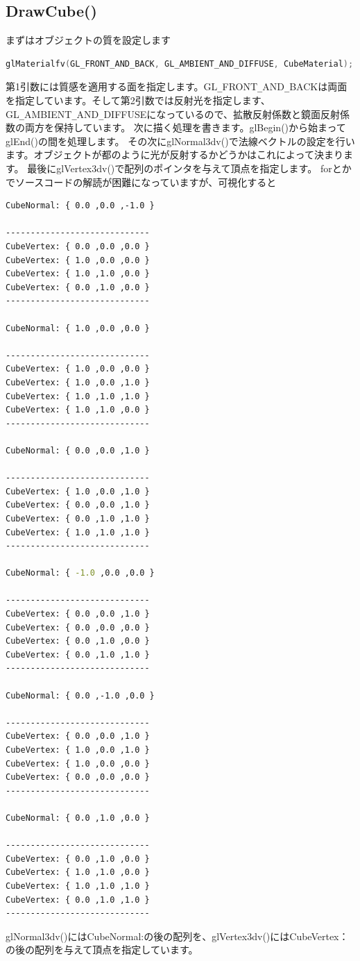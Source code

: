 \documentclass[a4paper,titlepage,dvipdfmx]{jsarticle}
\begin{document}
\subsection{DrawCube()}
まずはオブジェクトの質を設定します
\begin{lstlisting}[language=C++]
glMaterialfv(GL_FRONT_AND_BACK, GL_AMBIENT_AND_DIFFUSE, CubeMaterial);
\end{lstlisting}
第1引数には質感を適用する面を指定します。GL\verb|_|FRONT\verb|_|AND\verb|_|BACKは両面を指定しています。そして第2引数では反射光を指定します、GL\verb|_|AMBIENT\verb|_|AND\verb|_|DIFFUSEになっているので、拡散反射係数と鏡面反射係数の両方を保持しています。
次に描く処理を書きます。glBegin()から始まってglEnd()の間を処理します。
その次にglNormal3dv()で法線ベクトルの設定を行います。オブジェクトが都のように光が反射するかどうかはこれによって決まります。
最後にglVertex3dv()で配列のポインタを与えて頂点を指定します。
forとかでソースコードの解読が困難になっていますが、可視化すると
\begin{lstlisting}[language=bash]
CubeNormal: { 0.0 ,0.0 ,-1.0 }

-----------------------------
CubeVertex: { 0.0 ,0.0 ,0.0 }
CubeVertex: { 1.0 ,0.0 ,0.0 }
CubeVertex: { 1.0 ,1.0 ,0.0 }
CubeVertex: { 0.0 ,1.0 ,0.0 }
-----------------------------

CubeNormal: { 1.0 ,0.0 ,0.0 }

-----------------------------
CubeVertex: { 1.0 ,0.0 ,0.0 }
CubeVertex: { 1.0 ,0.0 ,1.0 }
CubeVertex: { 1.0 ,1.0 ,1.0 }
CubeVertex: { 1.0 ,1.0 ,0.0 }
-----------------------------

CubeNormal: { 0.0 ,0.0 ,1.0 }

-----------------------------
CubeVertex: { 1.0 ,0.0 ,1.0 }
CubeVertex: { 0.0 ,0.0 ,1.0 }
CubeVertex: { 0.0 ,1.0 ,1.0 }
CubeVertex: { 1.0 ,1.0 ,1.0 }
-----------------------------

CubeNormal: { -1.0 ,0.0 ,0.0 }

-----------------------------
CubeVertex: { 0.0 ,0.0 ,1.0 }
CubeVertex: { 0.0 ,0.0 ,0.0 }
CubeVertex: { 0.0 ,1.0 ,0.0 }
CubeVertex: { 0.0 ,1.0 ,1.0 }
-----------------------------

CubeNormal: { 0.0 ,-1.0 ,0.0 }

-----------------------------
CubeVertex: { 0.0 ,0.0 ,1.0 }
CubeVertex: { 1.0 ,0.0 ,1.0 }
CubeVertex: { 1.0 ,0.0 ,0.0 }
CubeVertex: { 0.0 ,0.0 ,0.0 }
-----------------------------

CubeNormal: { 0.0 ,1.0 ,0.0 }

-----------------------------
CubeVertex: { 0.0 ,1.0 ,0.0 }
CubeVertex: { 1.0 ,1.0 ,0.0 }
CubeVertex: { 1.0 ,1.0 ,1.0 }
CubeVertex: { 0.0 ,1.0 ,1.0 }
-----------------------------

\end{lstlisting}
glNormal3dv()にはCubeNormal:の後の配列を、glVertex3dv()にはCubeVertex：の後の配列を与えて頂点を指定しています。
\end{document}
